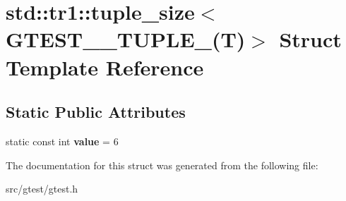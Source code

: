 \hypertarget{structstd_1_1tr1_1_1tuple__size_3_01_g_t_e_s_t__6___t_u_p_l_e___07_t_08_4}{}\section{std\+:\+:tr1\+:\+:tuple\+\_\+size$<$ G\+T\+E\+S\+T\+\_\+\_\+\+T\+U\+P\+L\+E\+\_\+(T)$>$ Struct Template Reference}
\label{structstd_1_1tr1_1_1tuple__size_3_01_g_t_e_s_t__6___t_u_p_l_e___07_t_08_4}
\subsection*{Static Public Attributes}
\begin{DoxyCompactItemize}
\item 
\mbox{\label{structstd_1_1tr1_1_1tuple__size_3_01_g_t_e_s_t__6___t_u_p_l_e___07_t_08_4_a5400701a7dfa80c78b89ff9de5c0271e}} 
static const int {\bfseries value} = 6
\end{DoxyCompactItemize}


The documentation for this struct was generated from the following file\+:\begin{DoxyCompactItemize}
\item 
src/gtest/gtest.\+h\end{DoxyCompactItemize}
